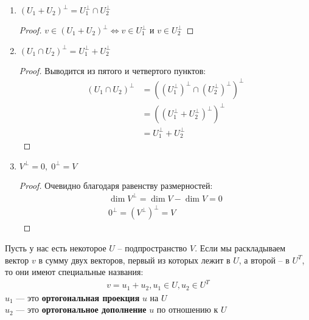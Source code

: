 \begin{theorem-non}
\begin{enumerate}
\begin{proof}
\begin{itemize}
                Раз размерности равны, и у нас есть одно включение, то получаем равенство.
            \end{itemize}
        \end{proof}
        \item $(U_1 + U_2)^\perp = U_1^\perp \cap U_2^\perp$
        \begin{proof}
            $v \in (U_1 + U_2)^\perp \Longleftrightarrow v \in U_1^\perp$ и $v \in U_2^\perp$
        \end{proof}
        \item $(U_1 \cap U_2)^\perp = U_1^\perp + U_2^\perp$
        \begin{proof}
            Выводится из пятого и четвертого пунктов: 
            \begin{align*}
                (U_1 \cap U_2)^\perp &= \left( (U_1^\perp)^\perp \cap (U_2^\perp)^\perp \right)^\perp \\
                &= \left( (U_1^\perp + U_2^\perp)^\perp \right)^\perp \\
                &= U_1^\perp + U_2^\perp  
            \end{align*}
        \end{proof}
        \item $V^\perp = 0, \; 0^\perp = V$
        \begin{proof}
            Очевидно благодаря равенству размерностей: 
            \begin{gather*}
                \dim{V^\perp} = \dim{V} - \dim{V} = 0 \\
                0^\perp = (V^\perp)^\perp = V
            \end{gather*}
        \end{proof}
    \end{enumerate}
\end{theorem-non}
\begin{conj}
    Пусть у нас есть некоторое $U$ -- подпространство $V$. 
    Если мы раскладываем вектор $v$ в сумму двух векторов, первый из которых лежит в $U$, а второй -- в $U^T$, то они имеют специальные 
    названия: 
    \begin{gather*}
        v = u_1 + u_2, u_1 \in U, u_2 \in U^T
    \end{gather*}
    $u_1$ --- это \textbf{ортогональная проекция}  $u$ на $U$ \\
    $u_2$ --- это \textbf{ортогональное дополнение}  $u$ по отношению к $U$
\end{conj}

